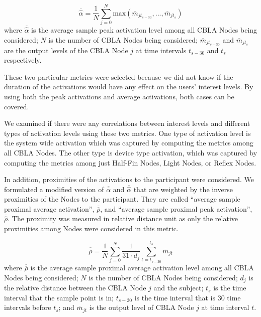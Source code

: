\begin{equation}\label{eqn:bar_hat_alpha}
\overline{\widehat{\alpha}} = \frac{1}{N}\sum_{j=0}^{N} \text{max}(\overline{m}_{jt_{s-30}}, ... , \overline{m}_{jt_{s}})
\end{equation}
where $\overline{\widehat{\alpha}}$ is the average sample peak activation level among all CBLA Nodes being considered; $N$ is the number of CBLA Nodes being considered; $\overline{m}_{jt_{s-30}}$ and $\overline{m}_{jt_s}$ are the output levels of the CBLA Node $j$ at time intervals $t_{s-30}$ and $t_s$ respectively.

These two particular metrics were selected because we did not know if the duration of the activations would have any effect on the users' interest levels. By using both the peak activations and average activations, both cases can be covered. 

We examined if there were any correlations between interest levels and different types of activation levels using these two metrics. One type of activation level is the system wide activation which was captured by computing the metrics among all CBLA Nodes. The other type is device type activation, which was captured by computing the metrics among just Half-Fin Nodes, Light Nodes, or Reflex Nodes. 

In addition, proximities of the activations to the participant were considered. We formulated a modified version of $\overline{\overline{\alpha}}$ and $\overline{\widehat{\alpha}}$ that are weighted by the inverse proximities of the Nodes to the participant. They are called ``average sample proximal average activation'', $\overline{\overline{\rho}}$, and ``average sample proximal peak activation'',  $\overline{\widehat{\rho}}$. The proximity was measured in relative distance unit as only the relative proximities among Nodes were considered in this metric. 

\begin{equation}\label{eqn:bar_bar_rho}
\overline{\overline{\rho}} = \frac{1}{N}\sum_{j=0}^{N} \frac{1}{31 \cdot d_j} \sum_{t=t_{s-30}}^{t_{s}}\overline{m}_{jt}
\end{equation}
where $\overline{\overline{\rho}}$ is the average sample proximal average activation level among all CBLA Nodes being considered; $N$ is the number of CBLA Nodes being considered; $d_j$ is the relative distance between the CBLA Node $j$ and the subject; $t_s$ is the time interval that the sample point is in; $t_{s-30}$ is the time interval that is 30 time intervals before $t_s$; and $\overline{m}_{jt}$ is the output level of CBLA Node $j$ at time interval $t$. 

